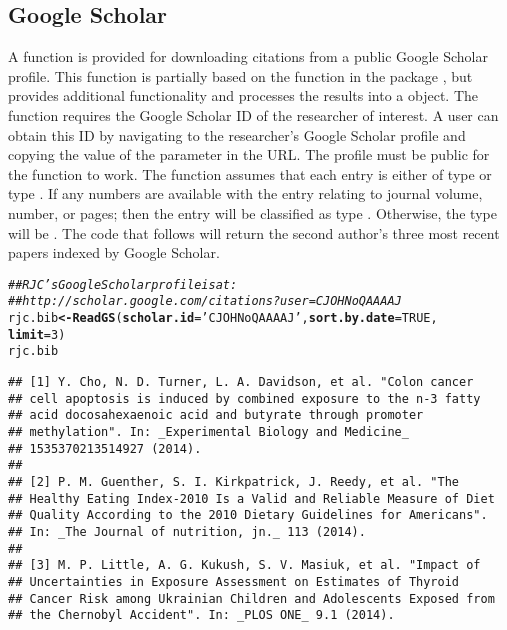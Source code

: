 \documentclass[article]{jss}\usepackage[]{graphicx}\usepackage[]{color}
\makeatletter
\newcommand{\hlnum}[1]{\textcolor[rgb]{0.125,0.125,1}{#1}}%
\newcommand{\hlstr}[1]{\textcolor[rgb]{0.125,0.125,1}{#1}}%
\newcommand{\hlcom}[1]{\textcolor[rgb]{1,0,0.753}{\textit{#1}}}%
\newcommand{\hlstd}[1]{\textcolor[rgb]{0.251,0.251,0.282}{#1}}%
\newcommand{\hlkwb}[1]{\textcolor[rgb]{0.439,0.251,1}{\textbf{#1}}}%
\newcommand{\hlkwc}[1]{\textcolor[rgb]{0.529,0,0.184}{\textbf{#1}}}%
\newcommand{\hlkwd}[1]{\textcolor[rgb]{0.251,0.251,0.282}{\textbf{#1}}}%
\newenvironment{kframe}{%
 \def\at@end@of@kframe{}%
 \ifinner\ifhmode%
  \def\at@end@of@kframe{\end{minipage}}%
  \begin{minipage}{\columnwidth}%
 \fi\fi%
 \def\FrameCommand##1{\hskip\@totalleftmargin \hskip-\fboxsep
 \colorbox{shadecolor}{##1}\hskip-\fboxsep
     \hskip-\linewidth \hskip-\@totalleftmargin \hskip\columnwidth}%
 \MakeFramed {\advance\hsize-\width
   \@totalleftmargin\z@ \linewidth\hsize
   \@setminipage}}%
 {\par\unskip\endMakeFramed%
 \at@end@of@kframe}
\newenvironment{knitrout}{}{} %
\makeatother
\begin{document}
\subsection{Google Scholar}
A function is provided for downloading citations from a public Google Scholar profile.  This function is partially based on the function  in the  package \citep{scholar}, but provides additional functionality and processes the results into a  object.  The function requires the Google Scholar ID of the researcher of interest.  A user can obtain this ID by navigating to the researcher's Google Scholar profile and copying the value of the  parameter in the URL.  The profile must be public for the function to work.  The function assumes that each entry is either of type  or type .  If any numbers are available with the entry relating to journal volume, number, or pages; then the entry will be classified as type .  Otherwise, the type will be .  The code that follows will return the second author's three most recent papers indexed by Google Scholar.
\begin{knitrout}
\color{fgcolor}\begin{kframe}
\begin{alltt}
\hlcom{## RJC's Google Scholar profile is at: }
\hlcom{## http://scholar.google.com/citations?user=CJOHNoQAAAAJ}
\hlstd{rjc.bib} \hlkwb{<-} \hlkwd{ReadGS}\hlstd{(}\hlkwc{scholar.id} \hlstd{=} \hlstr{'CJOHNoQAAAAJ'}\hlstd{,} \hlkwc{sort.by.date} \hlstd{=} \hlnum{TRUE}\hlstd{,}
                  \hlkwc{limit} \hlstd{=} \hlnum{3}\hlstd{)}
\hlstd{rjc.bib}
\end{alltt}
\begin{verbatim}
## [1] Y. Cho, N. D. Turner, L. A. Davidson, et al. "Colon cancer
## cell apoptosis is induced by combined exposure to the n-3 fatty
## acid docosahexaenoic acid and butyrate through promoter
## methylation". In: _Experimental Biology and Medicine_
## 1535370213514927 (2014).
## 
## [2] P. M. Guenther, S. I. Kirkpatrick, J. Reedy, et al. "The
## Healthy Eating Index-2010 Is a Valid and Reliable Measure of Diet
## Quality According to the 2010 Dietary Guidelines for Americans".
## In: _The Journal of nutrition, jn._ 113 (2014).
## 
## [3] M. P. Little, A. G. Kukush, S. V. Masiuk, et al. "Impact of
## Uncertainties in Exposure Assessment on Estimates of Thyroid
## Cancer Risk among Ukrainian Children and Adolescents Exposed from
## the Chernobyl Accident". In: _PLOS ONE_ 9.1 (2014).
\end{verbatim}
\end{kframe}
\end{knitrout}
\end{document}
